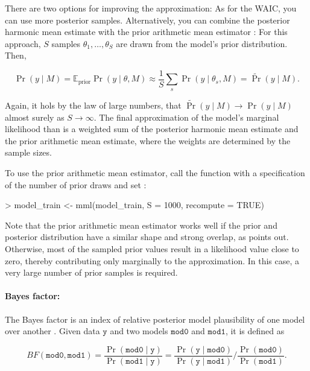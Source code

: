 \documentclass[article]{jss}
\newcommand{\fct}[1]{\code{#1()}}
\begin{document}
There are two options for improving the approximation: As for the WAIC, you can use more posterior samples. Alternatively, you can combine the posterior harmonic mean estimate with the prior arithmetic mean estimator \citep{Hammersley:1964}: For this approach, $S$ samples $\theta_1,\dots,\theta_S$ are drawn from the model's prior distribution. Then,

$$\Pr(y\mid M) = \mathbb{E}_\text{prior} \Pr(y\mid \theta,M) \approx \frac{1}{S} \sum_s \Pr(y\mid \theta_s,M) = \tilde{\Pr}(y\mid M).$$

Again, it hols by the law of large numbers, that $\tilde{\Pr}(y\mid M) \to \Pr(y\mid M)$ almost surely as $S \to \infty$. The final approximation of the model's marginal likelihood than is a weighted sum of the posterior harmonic mean estimate and the prior arithmetic mean estimate, where the weights are determined by the sample sizes.

To use the prior arithmetic mean estimator, call the \fct{mml} function with a specification of the number of prior draws  and set :

\begin{Schunk}
\begin{Sinput}
> model_train <- mml(model_train, S = 1000, recompute = TRUE)
\end{Sinput}
\end{Schunk}

Note that the prior arithmetic mean estimator works well if the prior and posterior distribution have a similar shape and strong overlap, as \cite{Gronau:2017} points out. Otherwise, most of the sampled prior values result in a likelihood value close to zero, thereby contributing only marginally to the approximation. In this case, a very large number  of prior samples is required.

\paragraph{Bayes factor:}

The Bayes factor is an index of relative posterior model plausibility of one model over another \citep{Marin:2014}. Given data $\texttt{y}$ and two models $\texttt{mod0}$ and $\texttt{mod1}$, it is defined as

$$
BF(\texttt{mod0},\texttt{mod1}) = \frac{\Pr(\texttt{mod0} \mid \texttt{y})}{\Pr(\texttt{mod1} \mid \texttt{y})} = \frac{\Pr(\texttt{y} \mid \texttt{mod0} )}{\Pr(\texttt{y} \mid \texttt{mod1})} / \frac{\Pr(\texttt{mod0})}{\Pr(\texttt{mod1})}.
$$
\end{document}

